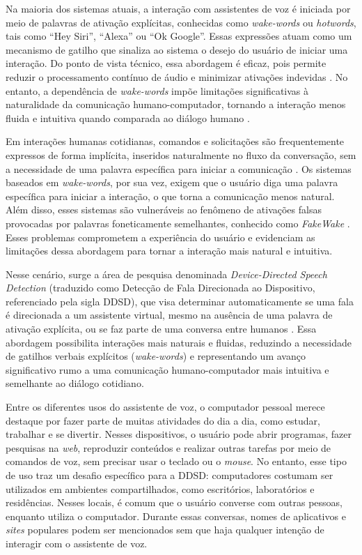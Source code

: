 \documentclass[
    12pt,                %
    openright,           %
    oneside,             %
    a4paper,             %
    english,             %
    brazil               %
]{abntex2}
\begin{document}
Na maioria dos sistemas atuais, a interação com assistentes de voz é iniciada por meio de palavras de ativação explícitas, conhecidas como \textit{wake-words} ou \textit{hotwords}, tais como ``Hey Siri'', ``Alexa'' ou ``Ok Google''. Essas expressões atuam como um mecanismo de gatilho que sinaliza ao sistema o desejo do usuário de iniciar uma interação. Do ponto de vista técnico, essa abordagem é eficaz, pois permite reduzir o processamento contínuo de áudio e minimizar ativações indevidas \cite{Garg2021}. No entanto, a dependência de \textit{wake-words} impõe limitações significativas à naturalidade da comunicação humano-computador, tornando a interação menos fluida e intuitiva quando comparada ao diálogo humano \cite{Nie2021}.

Em interações humanas cotidianas, comandos e solicitações são frequentemente expressos de forma implícita, inseridos naturalmente no fluxo da conversação, sem a necessidade de uma palavra específica para iniciar a comunicação \cite{Weld2023}. Os sistemas baseados em \textit{wake-words}, por sua vez, exigem que o usuário diga uma palavra específica para iniciar a interação, o que torna a comunicação menos natural. Além disso, esses sistemas são vulneráveis ao fenômeno de ativações falsas provocadas por palavras foneticamente semelhantes, conhecido como \textit{FakeWake} \cite{Chen2021}. Esses problemas comprometem a experiência do usuário e evidenciam as limitações dessa abordagem para tornar a interação mais natural e intuitiva.

Nesse cenário, surge a área de pesquisa denominada \textit{Device-Directed Speech Detection} (traduzido como Detecção de Fala Direcionada ao Dispositivo, referenciado pela sigla DDSD), que visa determinar automaticamente se uma fala é direcionada a um assistente virtual, mesmo na ausência de uma palavra de ativação explícita, ou se faz parte de uma conversa entre humanos \cite{Mallidi2018, Wagner2024}. Essa abordagem possibilita interações mais naturais e fluidas, reduzindo a necessidade de gatilhos verbais explícitos (\textit{wake-words}) e representando um avanço significativo rumo a uma comunicação humano-computador mais intuitiva e semelhante ao diálogo cotidiano.

Entre os diferentes usos do assistente de voz, o computador pessoal merece destaque por fazer parte de muitas atividades do dia a dia, como estudar, trabalhar e se divertir. Nesses dispositivos, o usuário pode abrir programas, fazer pesquisas na \textit{web}, reproduzir conteúdos e realizar outras tarefas por meio de comandos de voz, sem precisar usar o teclado ou o \textit{mouse}. No entanto, esse tipo de uso traz um desafio específico para a DDSD: computadores costumam ser utilizados em ambientes compartilhados, como escritórios, laboratórios e residências. Nesses locais, é comum que o usuário converse com outras pessoas, enquanto utiliza o computador. Durante essas conversas, nomes de aplicativos e \textit{sites} populares podem ser mencionados sem que haja qualquer intenção de interagir com o assistente de voz.
\end{document}
